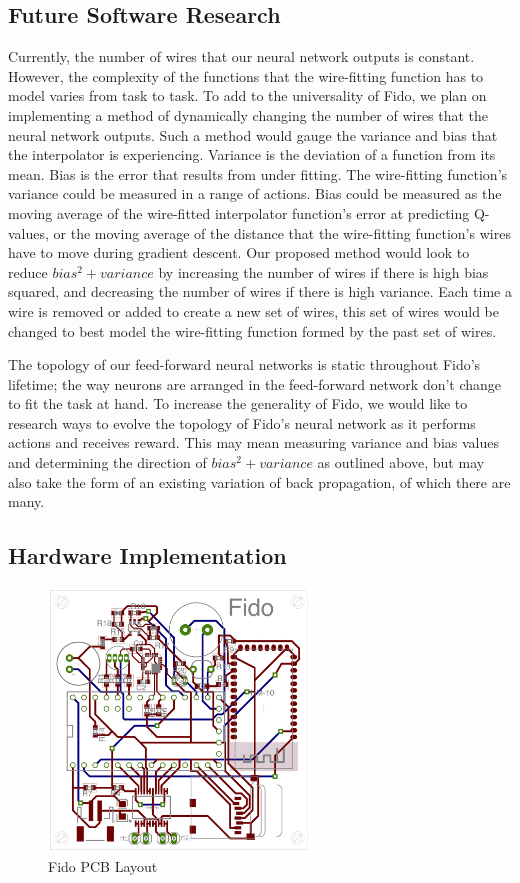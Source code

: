 \subsection{Future Software Research}

Currently, the number of wires that our neural network outputs is constant. However, the complexity of the functions that the wire-fitting function has to model varies from task to task. To add to the universality of Fido, we plan on implementing a method of dynamically changing the number of wires that the neural network outputs. Such a method would gauge the variance and bias that the interpolator is experiencing. Variance is the deviation of a function from its mean. Bias is the error that results from under fitting. The wire-fitting function's variance could be measured in a range of actions. Bias could be measured as the moving average of the wire-fitted interpolator function's error at predicting Q-values, or the moving average of the distance that the wire-fitting function's wires have to move during gradient descent. Our proposed method would look to reduce $bias^2 + variance$ by increasing the number of wires if there is high bias squared, and decreasing the number of wires if there is high variance. Each time a wire is removed or added to create a new set of wires, this set of wires would be changed to best model the wire-fitting function formed by the past set of wires.

The topology of our feed-forward neural networks is static throughout Fido's lifetime; the way neurons are arranged in the feed-forward network don't change to fit the task at hand.  To increase the generality of Fido, we would like to research ways to evolve the topology of Fido's neural network as it performs actions and receives reward. This may mean measuring variance and bias values and determining the direction of $bias^2 + variance$ as outlined above, but may also take the form of an existing variation of back propagation, of which there are many.

\subsection{Hardware Implementation}

\begin{figure}[ht]
	\centering
	\includegraphics[height=7cm]{Figures/boardLayout.png}
	\caption{Fido PCB Layout}
\end{figure}

